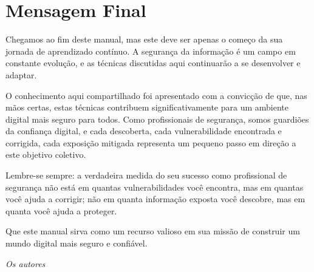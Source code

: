 \documentclass[12pt,a4paper]{book}
\begin{document}
\section{Mensagem Final}

Chegamos ao fim deste manual, mas este deve ser apenas o começo da sua jornada de aprendizado contínuo. A segurança da informação é um campo em constante evolução, e as técnicas discutidas aqui continuarão a se desenvolver e adaptar.

O conhecimento aqui compartilhado foi apresentado com a convicção de que, nas mãos certas, estas técnicas contribuem significativamente para um ambiente digital mais seguro para todos. Como profissionais de segurança, somos guardiões da confiança digital, e cada descoberta, cada vulnerabilidade encontrada e corrigida, cada exposição mitigada representa um pequeno passo em direção a este objetivo coletivo.

Lembre-se sempre: a verdadeira medida do seu sucesso como profissional de segurança não está em quantas vulnerabilidades você encontra, mas em quantas você ajuda a corrigir; não em quanta informação exposta você descobre, mas em quanta você ajuda a proteger.

Que este manual sirva como um recurso valioso em sua missão de construir um mundo digital mais seguro e confiável.

\begin{flushright}
\textit{Os autores}
\end{flushright}

\backmatter
\printindex
\end{document}
